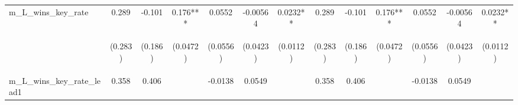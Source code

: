 \documentclass[]{article}
\begin{document}
\begin{center}
\begin{tabular}{lcccccccccccc}
m\_L\_wins\_key\_rate & 0.289 & -0.101 & 0.176*** & 0.0552 & -0.00564 & 0.0232** & 0.289 & -0.101 & 0.176*** & 0.0552 & -0.00564 & 0.0232** \\
\vspace{4pt} & \begin{footnotesize}(0.283)\end{footnotesize} & \begin{footnotesize}(0.186)\end{footnotesize} & \begin{footnotesize}(0.0472)\end{footnotesize} & \begin{footnotesize}(0.0556)\end{footnotesize} & \begin{footnotesize}(0.0423)\end{footnotesize} & \begin{footnotesize}(0.0112)\end{footnotesize} & \begin{footnotesize}(0.283)\end{footnotesize} & \begin{footnotesize}(0.186)\end{footnotesize} & \begin{footnotesize}(0.0472)\end{footnotesize} & \begin{footnotesize}(0.0556)\end{footnotesize} & \begin{footnotesize}(0.0423)\end{footnotesize} & \begin{footnotesize}(0.0112)\end{footnotesize} \\
m\_L\_wins\_key\_rate\_lead1 & 0.358 & 0.406 &  & -0.0138 & 0.0549 &  & 0.358 & 0.406 &  & -0.0138 & 0.0549 &  \\

\end{tabular}
\end{center}
\end{document}

